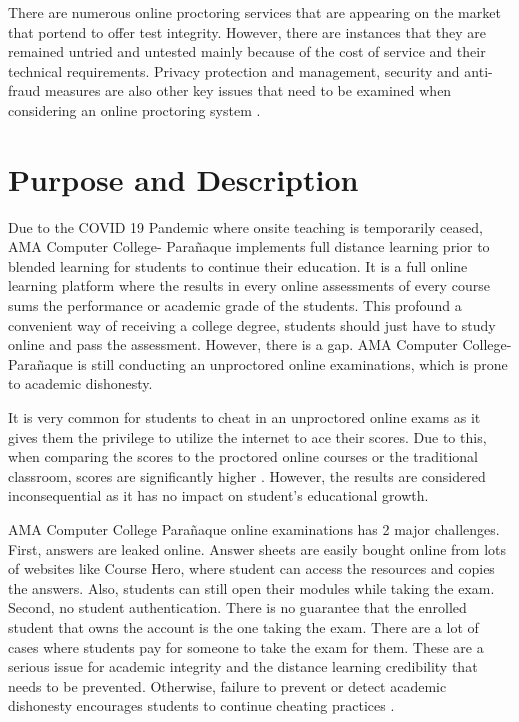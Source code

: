 There are numerous online proctoring services that are appearing on the market that portend to offer test integrity.
However, there are instances that they are remained untried and untested mainly because of the cost of service and their technical requirements.
Privacy protection and management, security and anti-fraud measures are also other key issues that need to be examined when considering an online proctoring system \cite{sietses2016white}.

\section{Purpose and Description}

Due to the COVID 19 Pandemic where onsite teaching is temporarily ceased, AMA Computer College- Parañaque implements full distance learning prior to blended learning for students to continue their education.
It is a full online learning platform where the results in every online assessments of every course sums the performance or academic grade of the students.
This profound a convenient way of receiving a college degree, students should just have to study online and pass the assessment.
However, there is a gap.
AMA Computer College- Parañaque is still conducting an unproctored online examinations, which is prone to academic dishonesty.

It is very common for students to cheat in an unproctored online exams as it gives them the privilege to utilize the internet to ace their scores.
Due to this, when comparing the scores to the proctored online courses or the traditional classroom, scores are significantly higher \cite{weiner2017comparative}.
However, the results are considered inconsequential as it has no impact on student’s educational growth.

AMA Computer College Parañaque online examinations has 2 major challenges.
First, answers are leaked online.
Answer sheets are easily bought online from lots of websites like Course Hero, where student can access the resources and copies the answers.
Also, students can still open their modules while taking the exam.
Second, no student authentication.
There is no guarantee that the enrolled student that owns the account is the one taking the exam.
There are a lot of cases where students pay for someone to take the exam for them.
These are a serious issue for academic integrity and the distance learning credibility that needs to be prevented.
Otherwise, failure to prevent or detect academic dishonesty encourages students to continue cheating practices \cite{teh2013reducing}.

